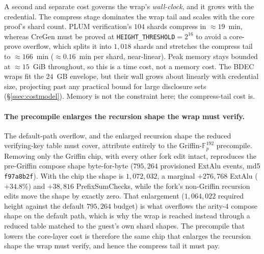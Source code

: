 A second and separate cost governs the wrap's \emph{wall-clock}, and it grows with the credential. The compress stage dominates the wrap tail and scales with the core proof's shard count. PLUM verification's $104$ shards compress in ${\approx}19$~min, whereas CreGen must be proved at \texttt{HEIGHT\_THRESHOLD}$=2^{16}$ to avoid a core-prove overflow, which splits it into $1{,}018$ shards and stretches the compress tail to ${\approx}166$~min (${\approx}0.16$~min per shard, near-linear). Peak memory stays bounded at ${\approx}15$~GiB throughout, so this is a time cost, not a memory cost. The BDEC wraps fit the $24$~GB envelope, but their wall grows about linearly with credential size, projecting past any practical bound for large disclosure sets (\S\ref{ssec:costmodel}). Memory is not the constraint here; the compress-tail cost is.


\paragraph{The precompile enlarges the recursion shape the wrap must verify.}
The default-path overflow, and the enlarged recursion shape the reduced verifying-key table must cover, attribute entirely to the Griffin-$\mathbb{F}_p^{192}$ precompile. Removing only the Griffin chip, with every other fork edit intact, reproduces the pre-Griffin compose shape byte-for-byte ($795{,}264$ provisioned ExtAlu events, md5 \texttt{f97a8b2f}). With the chip the shape is $1{,}072{,}032$, a marginal $+276{,}768$ ExtAlu ($+34.8\%$) and $+38{,}816$ PrefixSumChecks, while the fork's non-Griffin recursion edits move the shape by exactly zero. That enlargement ($1{,}064{,}022$ required height against the default $795{,}264$ budget) is what overflows the arity-$4$ compose shape on the default path, which is why the wrap is reached instead through a reduced table matched to the guest's own shard shapes. The precompile that lowers the core-layer cost is therefore the same chip that enlarges the recursion shape the wrap must verify, and hence the compress tail it must pay.

